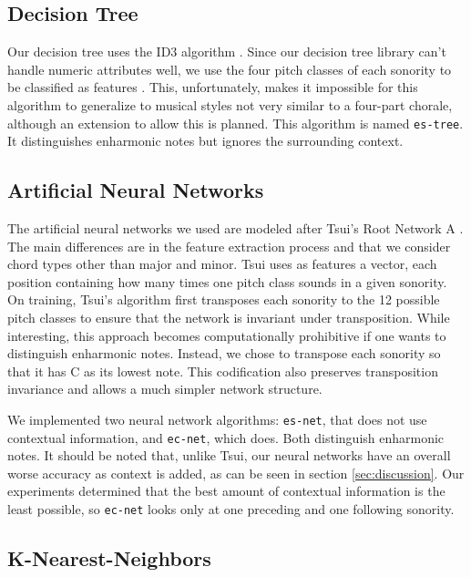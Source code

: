 \documentclass{article}
\begin{document}
\subsection{Decision Tree}
\label{sec:tree}

Our decision tree uses the ID3 algorithm \cite{mitchell97:machine}.
Since our decision tree library can't handle numeric attributes well,
we use the four pitch classes of each sonority to be classified as
features . This, unfortunately, makes it impossible for this algorithm
to generalize to musical styles not very similar to a four-part
chorale, although an extension to allow this is planned. This
algorithm is named \texttt{es-tree}. It distinguishes enharmonic notes
but ignores the surrounding context.

\subsection{Artificial Neural Networks}
\label{sec:neural-net}


The artificial neural networks we used are modeled after Tsui's Root
Network A \cite{tsui02:harmonic}. The main differences are in the
feature extraction process and that we consider chord types other than
major and minor. Tsui uses as features a vector, each position
containing how many times one pitch class sounds in a given
sonority. On training, Tsui's algorithm first transposes each sonority
to the 12 possible pitch classes to ensure that the network is
invariant under transposition. While interesting, this approach
becomes computationally prohibitive if one wants to distinguish
enharmonic notes. Instead, we chose to transpose each sonority so that
it has C as its lowest note. This codification also preserves
transposition invariance and allows a much simpler network structure.

We implemented two neural network algorithms: \texttt{es-net}, that
does not use contextual information, and \texttt{ec-net}, which
does. Both distinguish enharmonic notes.  It should be noted that,
unlike Tsui, our neural networks have an overall worse accuracy as
context is added, as can be seen in section \ref{sec:discussion}. Our
experiments determined that the best amount of contextual information
is the least possible, so \texttt{ec-net} looks only at one preceding
and one following sonority.


\subsection{K-Nearest-Neighbors}
\label{sec:knn}
\end{document}
